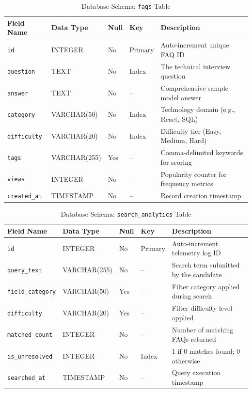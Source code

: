 \documentclass[12pt,a4paper]{report}
\begin{document}
\begin{table}[h!]
\centering
\caption{Database Schema: \texttt{faqs} Table}
\label{tab:faqs}
\begin{tabularx}{\textwidth}{llllX}
\toprule
\textbf{Field Name} & \textbf{Data Type} & \textbf{Null} & \textbf{Key} & \textbf{Description} \\
\midrule
\texttt{id} & INTEGER & No & Primary & Auto-increment unique FAQ ID \\
\texttt{question} & TEXT & No & Index & The technical interview question \\
\texttt{answer} & TEXT & No & -- & Comprehensive sample model answer \\
\texttt{category} & VARCHAR(50) & No & Index & Technology domain (e.g., React, SQL) \\
\texttt{difficulty} & VARCHAR(20) & No & Index & Difficulty tier (Easy, Medium, Hard) \\
\texttt{tags} & VARCHAR(255) & Yes & -- & Comma-delimited keywords for scoring \\
\texttt{views} & INTEGER & No & -- & Popularity counter for frequency metrics \\
\texttt{created\_at} & TIMESTAMP & No & -- & Record creation timestamp \\
\bottomrule
\end{tabularx}
\end{table}

\begin{table}[h!]
\centering
\caption{Database Schema: \texttt{search\_analytics} Table}
\label{tab:analytics}
\begin{tabularx}{\textwidth}{llllX}
\toprule
\textbf{Field Name} & \textbf{Data Type} & \textbf{Null} & \textbf{Key} & \textbf{Description} \\
\midrule
\texttt{id} & INTEGER & No & Primary & Auto-increment telemetry log ID \\
\texttt{query\_text} & VARCHAR(255) & No & -- & Search term submitted by the candidate \\
\texttt{field\_category}& VARCHAR(50) & Yes & -- & Filter category applied during search \\
\texttt{difficulty} & VARCHAR(20) & Yes & -- & Filter difficulty level applied \\
\texttt{matched\_count}& INTEGER & No & -- & Number of matching FAQs returned \\
\texttt{is\_unresolved} & INTEGER & No & Index & 1 if 0 matches found; 0 otherwise \\
\texttt{searched\_at} & TIMESTAMP & No & -- & Query execution timestamp \\
\bottomrule
\end{tabularx}
\end{table}
\end{document}
